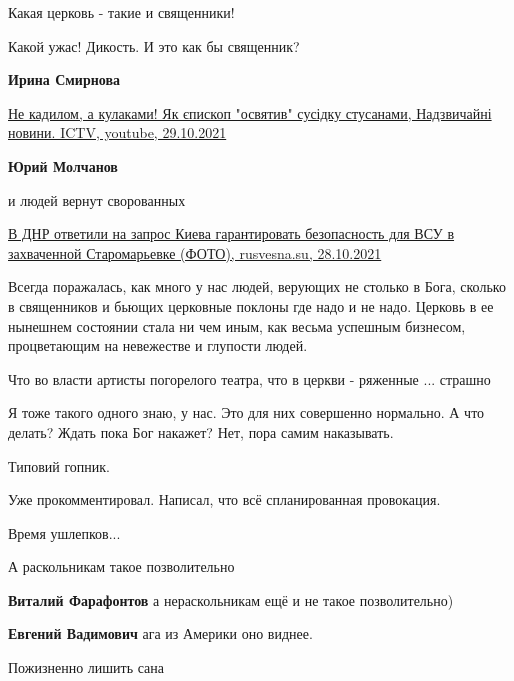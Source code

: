 \begin{itemize}
Какая церковь - такие и священники!

Какой ужас! Дикость. И это как бы священник?

\begin{itemize} %
\textbf{Ирина Смирнова} 

\href{https://www.youtube.com/watch?v=G3voSSQNKZw}{%
Не кадилом, а кулаками! Як єпископ "освятив" сусідку стусанами, %
Надзвичайні новини. ICTV, youtube, 29.10.2021%
}

\textbf{Юрий Молчанов} 

и людей вернут сворованных 

\href{https://rusvesna.su/news/1635428016}{%
В ДНР ответили на запрос Киева гарантировать безопасность для ВСУ в захваченной Старомарьевке (ФОТО), %
rusvesna.su, 28.10.2021%
}



\end{itemize} %


Всегда поражалась, как много у нас людей, верующих не столько в Бога, сколько в
священников и бьющих церковные поклоны где надо и не надо. Церковь в ее
нынешнем состоянии стала ни чем иным, как весьма успешным бизнесом,
процветающим на невежестве и глупости людей.

Что во власти артисты погорелого театра, что в церкви - ряженные ... страшно

Я тоже такого одного знаю, у нас. Это для них совершенно нормально.
А что делать? Ждать пока Бог накажет? Нет, пора самим наказывать.

Типовий гопник.

Уже прокомментировал. Написал, что всё спланированная провокация.

Время ушлепков...

А раскольникам такое позволительно

\begin{itemize} %
\textbf{Виталий Фарафонтов} а нераскольникам ещё и не такое позволительно)

\textbf{Евгений Вадимович} ага из Америки оно виднее.
\end{itemize} %

Пожизненно лишить сана


\end{itemize}

